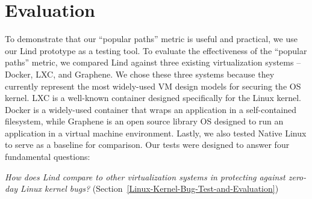 \section{Evaluation}
\label{sec.evaluation}

To demonstrate that our ``popular paths'' metric is useful and practical, 
we use our Lind prototype as a testing tool. 
To evaluate the effectiveness of the ``popular paths'' metric,
we compared Lind against three existing
virtualization systems -- Docker, LXC, and Graphene.
We chose these three systems because they currently represent the most
widely-used VM design models for securing the OS kernel.
LXC is a well-known container designed specifically for the Linux kernel.
Docker is a widely-used container that wraps an application in a self-contained filesystem, while
Graphene is an open source library OS designed to run an application in a virtual machine environment.
Lastly, we also tested Native Linux to serve as a
baseline for comparison.
%
Our tests were designed to answer four fundamental questions:

\textit{How does Lind compare to other virtualization systems
in protecting against zero-day Linux kernel bugs?}
(Section~{\ref{Linux-Kernel-Bug-Test-and-Evaluation}})

